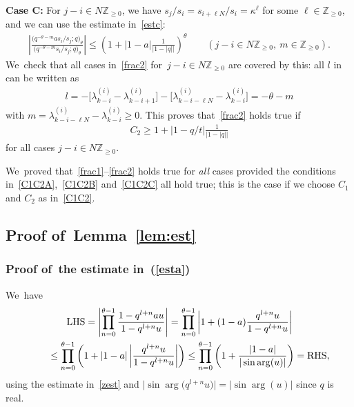 \documentclass[pdftex]{sigma}%
\numberwithin{equation}{section}
\newcommand{\Z}{{\mathbb Z}}
\begin{document}
{\bf Case C:} For $j-i\in N\Z_{\geq 0}$, we have $s_j/s_i = s_{i+\ell N}/s_i=\kappa^\ell$ for some $\ell\in\Z_{\geq 0}$, and we can use the estimate in~\eqref{estc}:
\begin{gather*}
\left|\frac{\big(q^{-\theta-m}as_i/s_j;q\big)_\theta}{\big(q^{-\theta-m} s_i/s_j;q\big)_\theta}\right|\leq \left(1+|1-a|\frac{1}{|1-|q||} \right)^\theta\qquad
(j-i\in N\Z_{\geq 0},\ m\in\Z_{\geq 0}).
\end{gather*}
We~check that all cases in~\eqref{frac2} for~$j-i\in N\Z_{\geq 0}$ are covered by this: all $l$ in can be written as
\begin{gather*}
l=-\big[\lambda^{(i)}_{k-i}-\lambda^{(i)}_{k-i+1}\big]-\big[\lambda^{(i)}_{k-i-\ell N}-\lambda^{(i)}_{k-i}\big] = -\theta-m
\end{gather*}
with $m=\lambda^{(i)}_{k-i-\ell N}-\lambda^{(i)}_{k-i}\geq 0$.
This proves that~\eqref{frac2} holds true if
\begin{gather}\label{C1C2C}
C_2\geq 1+|1-q/t|\frac{1}{|1-|q||}
\end{gather}
for all cases $j-i\in N\Z_{\geq 0}$.

We~proved that~\eqref{frac1}--\eqref{frac2} holds true for {\em all} cases provided the conditions in~\eqref{C1C2A},~\eqref{C1C2B} and~\eqref{C1C2C} all hold true; this is the case if we choose $C_1$ and $C_2$ as in~\eqref{C1C2}.

\subsection[Proof of~Lemma~B1]{Proof of~Lemma~\ref{lem:est}}\label{app:prooflem:est}
\subsubsection[Proof of~the estimate in (B.5)]{Proof of~the estimate in~(\ref{esta})}
We~have
\begin{gather*}
\text{LHS} = \left|\prod_{n=0}^{\theta-1}\frac{1-q^{l+n}au}{1-q^{l+n}u} \right| = \prod_{n=0}^{\theta-1}\left|1+(1-a)\frac{q^{l+n}u}{1-q^{l +n}u} \right|
\\ \hphantom{\text{LHS}}
{}\leq \prod_{n=0}^{\theta-1}\left(1+|1-a|\left|\frac{q^{l+n}u}{1-q^{l+n}u}\right| \right)\leq \prod_{n=0}^{\theta-1}\left(1+\frac{|1-a|}{|\sin\arg(u)|}\right) =
\text{RHS},
\end{gather*}
using the estimate in~\eqref{zest} and $\big|\sin\arg\big(q^{l+n}u\big)\big|=|\sin\arg(u)|$ since $q$ is real.
\end{document}
